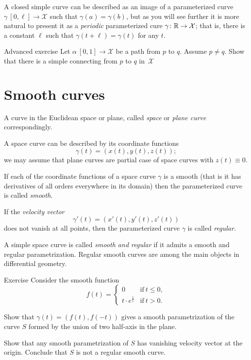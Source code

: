 A closed simple curve can be described as an image of a parameterized curve $\gamma\: [0,\ell]\to \mathcal{X}$ such that $\gamma(a)=\gamma(b)$,
but as you will see further it is more natural to present it as a \emph{periodic} parameterized cure $\gamma\colon \mathbb{R}\to \mathcal{X}$; that is, there is a constant $\ell$ such that $\gamma(t+\ell)=\gamma(t)$ for any $t$.

\begin{thm}{Advanced exercise}
Let $\alpha\:[0,1]\to\mathcal{X}$ be a path from $p$ to $q$.
Assume $p\ne q$.
Show that there is a simple connecting from $p$ to $q$ in~$\mathcal{X}$
\end{thm}

\section*{Smooth curves}

A curve in the Euclidean space or plane, called \emph{space} or \emph{plane curve} correspondingly.

A space curve can be described by its coordinate functions 
\[\gamma(t)=(x(t),y(t),z(t));\]
we may assume that plane curves are partial case of space curves with $z(t)\equiv 0$.

If each of the coordinate functions of a space curve $\gamma$ is a smooth (that is it has derivatives of all orders everywhere in its domain) then the parameterized curve is called \emph{smooth}.

If the \emph{velocity vector} 
\[\gamma'(t)=(x'(t),y'(t),z'(t))\] 
does not vanish at all points, then the parameterized curve $\gamma$ is called \emph{regular}.

A simple space curve is called \emph{smooth and regular} if it admits a smooth and regular parametrization.
Regular smooth curves are among the main objects in differential geometry.

\begin{thm}{Exercise}\label{ex:L-shape}
Consider the smooth function 
\[f(t)=
\begin{cases}
0&\text{if}\ t\le 0,
\\
t\cdot e^{\frac1t}&\text{if}\ t> 0.
\end{cases}
\]

Show that $\gamma(t)=(f(t),f(-t))$ gives a smooth parametrization of the curve $S$ formed by the union of two half-axis in the plane.

Show that any smooth parametrization of $S$ has vanishing velocity vector at the origin.
Conclude that $S$ is not a regular smooth curve.
\end{thm}


